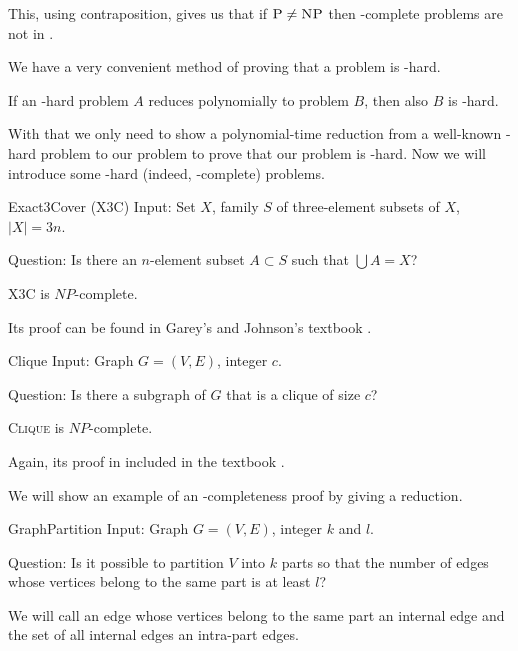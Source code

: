 This, using contraposition, gives us that if $\text{\textsc{P}} \neq \text{\textsc{NP}}$ then \np-complete problems are not in \p.

We have a very convenient method of proving that a problem is \np-hard.

\begin{rmrk}
If an \np-hard problem $A$ reduces polynomially to problem $B$, then also $B$ is \np-hard.
\end{rmrk}

With that we only need to show a polynomial-time reduction from a well-known \np-hard problem
to our problem to prove that our problem is \np-hard.
Now we will introduce some \np-hard (indeed, \np-complete) problems.

\begin{problem}{Exact3Cover (X3C)}
	Input: Set $X$, family $S$ of three-element subsets of $X$, $\vert{X}\vert = 3n$.

	Question: Is there an $n$-element subset $A \subset S$ such that $\bigcup A = X$?
\end{problem}

\begin{thm}
\textsc{X3C} is $NP$-complete.
\end{thm}

Its proof can be found in Garey's and Johnson's textbook \cite{computersandintractability}.

\begin{problem}{Clique}
    Input: Graph $G = (V, E)$, integer $c$.

    Question: Is there a subgraph of $G$ that is a clique of size $c$?
\end{problem}

\begin{thm}
\textsc{Clique} is $NP$-complete.
\end{thm}

Again, its proof in included in the textbook \cite{computersandintractability}.


We will show an example of an \np-completeness proof by giving a reduction.

\begin{problem}{GraphPartition}
Input: Graph $G = (V, E)$, integer $k$ and $l$.

Question: Is it possible to partition $V$ into $k$ parts so that the number of edges
whose vertices belong to the same part is at least $l$?
\end{problem}

We will call an edge whose vertices belong to the same part an internal edge
and the set of all internal edges an intra-part edges.

